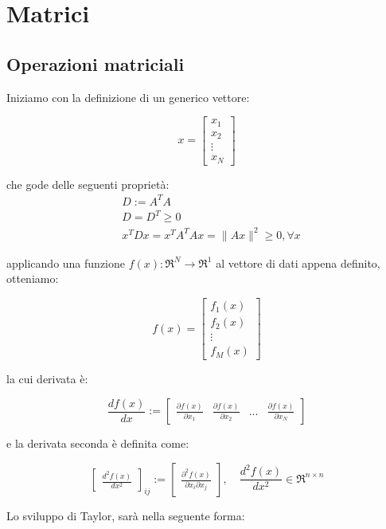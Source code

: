 \chapter{Matrici}
\section{Operazioni matriciali\label{app:operatorimatriciali}}
Iniziamo con la definizione di un generico vettore:

  \[ x=\begin{bmatrix} x_1 \\ x_2 \\ \vdots \\x_N \end{bmatrix} \]

che gode delle seguenti proprietà:
  \begin{align*}
     &D:=A^TA\\
     &D=D^T \geq 0 \\
     &x^TDx=x^TA^TAx=\| Ax \|^2 \geq 0 , \forall x
  \end{align*}

\noindent applicando una funzione $f(x):\Re^N \rightarrow \Re^1$ al vettore di dati appena definito, otteniamo:

  \[ f(x)=\begin{bmatrix}f_1(x) \\ f_2(x) \\ \vdots \\ f_M(x)\end{bmatrix} \]

\noindent la cui derivata è:

  \[ \frac{df(x)}{dx}:=\begin{bmatrix} \frac{\partial f(x)}{\partial x_1} & \frac{\partial f(x)}{\partial x_2} & ... & \frac{\partial f(x)}{\partial x_N} \end{bmatrix} \]

\noindent e la derivata seconda è definita come:

  \[ \begin{bmatrix}\frac{d^2f(x)}{dx^2}\end{bmatrix}_{ij}:=\begin{bmatrix}\frac{\partial^2f(x)}{\partial x_i \partial x_j}  \end{bmatrix}, \quad \frac{d^2f(x)}{dx^2} \in \Re^{n \times n} \]

\noindent Lo sviluppo di Taylor, sarà nella seguente forma:

